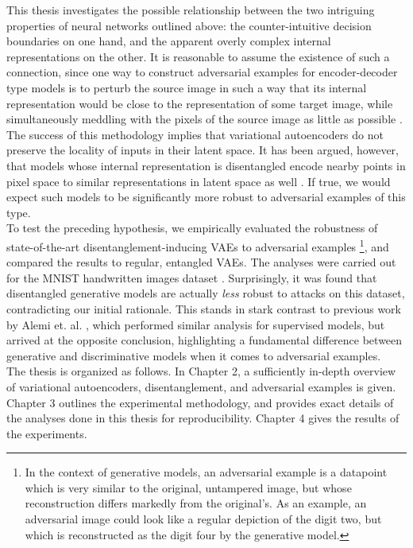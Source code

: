 \documentclass{report}
\begin{document}
\noindent This thesis investigates the possible relationship between the two intriguing properties of neural networks outlined above: the counter-intuitive decision boundaries on one hand, and the apparent overly complex internal representations on the other. It is reasonable to assume the existence of such a connection, since one way to construct adversarial examples for encoder-decoder type models is to perturb the source image in such a way that its internal representation would be close to the representation of some target image, while simultaneously meddling with the pixels of the source image as little as possible \cite{kos-gen-adv, tabacof-gen-adv}. The success of this methodology implies that variational autoencoders do not preserve the locality of inputs in their latent space. It has been argued, however, that models whose internal representation is disentangled encode nearby points in pixel space to similar representations in latent space as well \cite{beta-vae}. If true, we would expect such models to be significantly more robust to adversarial examples of this type. \\

\noindent To test the preceding hypothesis, we empirically evaluated the robustness of state-of-the-art disentanglement-inducing VAEs to adversarial examples \footnote{In the context of generative models, an adversarial example is a datapoint which is very similar to the original, untampered image, but whose reconstruction differs markedly from the original's. As an example, an adversarial image could look like a regular depiction of the digit two, but which is reconstructed as the digit four by the generative model.}, and compared the results to regular, entangled VAEs. The analyses were carried out for the MNIST handwritten images dataset \cite{mnist}. Surprisingly, it was found that disentangled generative models are actually \textit{less} robust to attacks on this dataset, contradicting our initial rationale. This stands in stark contrast to previous work by Alemi et. al. \cite{deep-variational-bottleneck}, which performed similar analysis for supervised models, but arrived at the opposite conclusion, highlighting a fundamental difference between generative and discriminative models when it comes to adversarial examples. \\

\noindent The thesis is organized as follows. In Chapter 2, a sufficiently in-depth overview of variational autoencoders, disentanglement, and adversarial examples is given. Chapter 3 outlines the experimental methodology, and provides exact details of the analyses done in this thesis for reproducibility. Chapter 4 gives the results of the experiments. 
\end{document}
